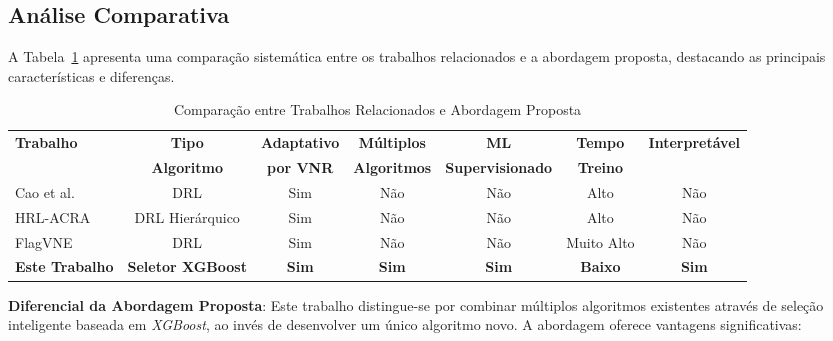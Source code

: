 \documentclass[conference]{IEEEtran}
\begin{document}
\subsection{Análise Comparativa}

A Tabela~\ref{tab:related-work} apresenta uma comparação sistemática entre os trabalhos relacionados e a abordagem proposta, destacando as principais características e diferenças.

\begin{table}[t]
\centering
\caption{Comparação entre Trabalhos Relacionados e Abordagem Proposta}
\label{tab:related-work}
\begin{tabular}{lcccccc}
\toprule
\textbf{Trabalho} & \textbf{Tipo} & \textbf{Adaptativo} & \textbf{Múltiplos} & \textbf{ML} & \textbf{Tempo} & \textbf{Interpretável} \\
                  & \textbf{Algoritmo} & \textbf{por VNR} & \textbf{Algoritmos} & \textbf{Supervisionado} & \textbf{Treino} & \\
\midrule
Cao et al.~\cite{cao2018nfv-deeprl} & DRL & Sim & Não & Não & Alto & Não \\
HRL-ACRA~\cite{tsc-2023-hrl-acra} & DRL Hierárquico & Sim & Não & Não & Alto & Não \\
FlagVNE~\cite{ijcai-2024-flagvne} & DRL & Sim & Não & Não & Muito Alto & Não \\
\midrule
\textbf{Este Trabalho} & \textbf{Seletor XGBoost} & \textbf{Sim} & \textbf{Sim} & \textbf{Sim} & \textbf{Baixo} & \textbf{Sim} \\
\bottomrule
\end{tabular}
\end{table}

\textbf{Diferencial da Abordagem Proposta}: Este trabalho distingue-se por combinar múltiplos algoritmos existentes através de seleção inteligente baseada em \textit{XGBoost}, ao invés de desenvolver um único algoritmo novo. A abordagem oferece vantagens significativas:
\end{document}
